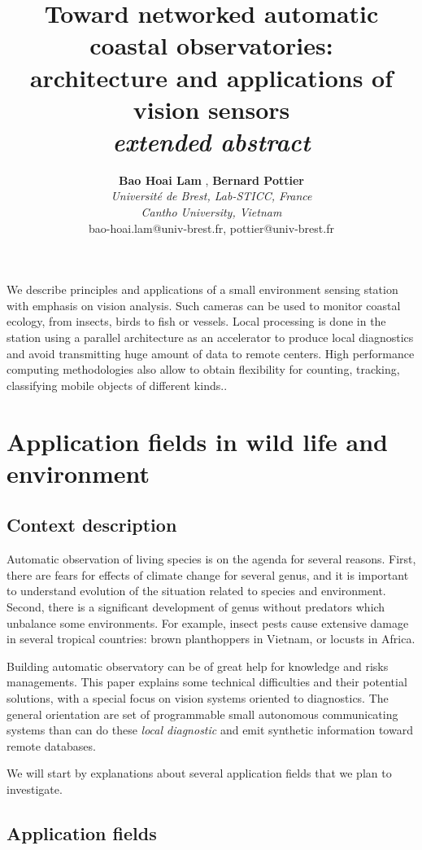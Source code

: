 \documentclass[10pt,a4paper]{article}
\title{Toward networked automatic coastal observatories:\\
architecture and  applications of vision sensors\\ 
{\sl extended abstract}}
\author{{ \textbf{Bao Hoai Lam \dag},  \textbf{Bernard Pottier}} \\
\textit{Universit{\'e} de Brest, Lab-STICC, France}\\
\textit{\dag Cantho University, Vietnam}\\
bao-hoai.lam@univ-brest.fr, pottier@univ-brest.fr}
\begin{document}
\maketitle


 We describe principles and applications of a small environment sensing station with emphasis on 
vision analysis. Such cameras can be used to monitor coastal ecology, from insects, birds to fish or vessels. 
Local processing is done in the station using a parallel architecture as an accelerator to 
produce local diagnostics and avoid transmitting  huge amount of data to remote centers. 
High performance computing methodologies also allow to obtain flexibility for counting, tracking, classifying
mobile objects of different kinds..


\section {Application fields in wild life and environment}
\subsection {Context description}

Automatic observation of living species is on the agenda for several reasons. First, there are fears for effects of climate change for several genus, and it is important to understand evolution of the situation related to species and environment. Second, there is a significant development of genus without predators which unbalance some environments. For example, insect pests cause extensive damage in several tropical countries: brown planthoppers in Vietnam, or locusts in Africa.

Building automatic observatory can be of great help for knowledge and risks managements. This paper explains some technical difficulties and their potential solutions, with a special focus on vision systems oriented to diagnostics. The general orientation are set of  programmable small autonomous communicating systems than can 
do these {\sl local diagnostic}  and emit synthetic information toward remote databases.

We will start by explanations about several application fields that we plan to investigate.

\subsection {Application fields}
\end{document}
